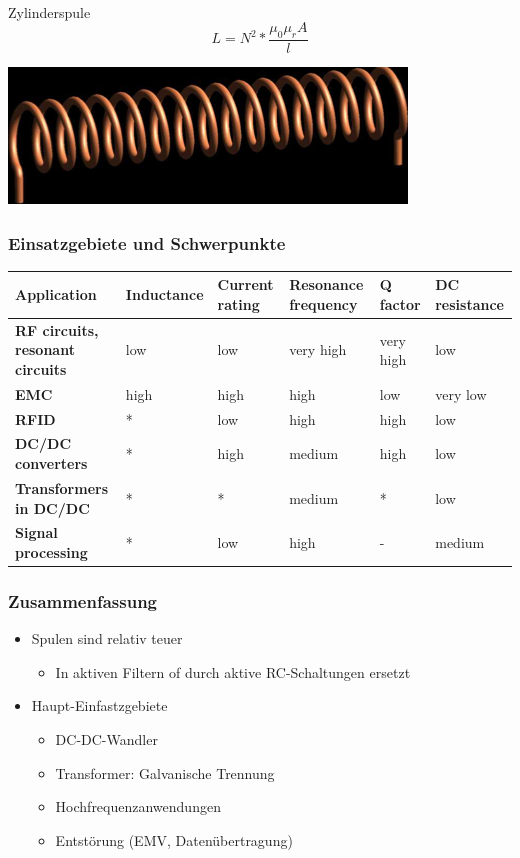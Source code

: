 \\
\begin{minipage}{9cm}
Zylinderspule\\
\begin{equation}
L=N^2*\frac{\mu_{0}\mu_{r}A}{l}
\end{equation}
\end{minipage}
\begin{minipage}{9cm}
\includegraphics[scale=0.4]{pictures/zylinderspule}
\end{minipage}

\subsubsection{Einsatzgebiete und Schwerpunkte}
\begin{longtable}{|p{3.5cm}|l|l|l|l|l|}
\hline
\textbf{Application}&Inductance&Current rating&Resonance frequency&Q factor&DC
resistance\\
\hline
\textbf{RF circuits, resonant circuits}&low&low&very high&very high&low\\
\hline
\textbf{EMC}&high&high&high&low&very low\\
\hline
\textbf{RFID}&*&low&high&high&low\\
\hline
\textbf{DC/DC converters}&*&high&medium&high&low\\
\hline
\textbf{Transformers in DC/DC}&*&*&medium&*&low\\
\hline
\textbf{Signal processing}&*&low&high&-&medium\\
\hline
\end{longtable}

\subsubsection{Zusammenfassung}
\begin{itemize}
  \item Spulen sind relativ teuer
  \begin{itemize}
    \item In aktiven Filtern of durch aktive RC-Schaltungen ersetzt
  \end{itemize}
  \item Haupt-Einfastzgebiete
  \begin{itemize}
    \item DC-DC-Wandler
    \item Transformer: Galvanische Trennung
    \item Hochfrequenzanwendungen
    \item Entstörung (EMV, Datenübertragung)
  \end{itemize}
\end{itemize}
